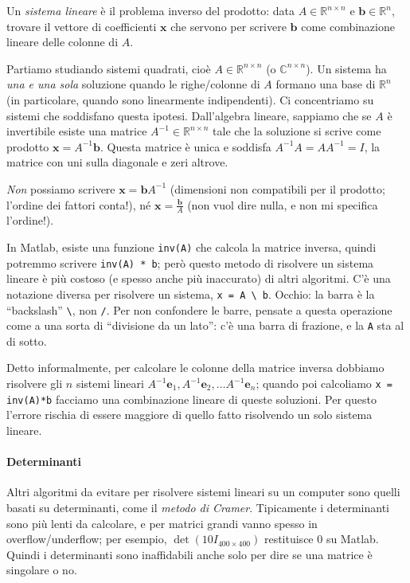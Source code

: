 \documentclass[a4paper]{report}
\theoremstyle{definiton}
\theoremstyle{remark}
\begin{document}

Un \emph{sistema lineare} è il problema inverso del prodotto: data $A\in\mathbb{R}^{n\times n}$ e $\mathbf{b} \in \mathbb{R}^n$, trovare il vettore di coefficienti $\mathbf{x}$ che servono per scrivere $\mathbf{b}$ come combinazione lineare delle colonne di $A$.

Partiamo studiando sistemi quadrati, cioè $A \in \mathbb{R}^{n\times n}$ (o $\mathbb{C}^{n\times n}$). Un sistema ha \emph{una e una sola} soluzione quando le righe/colonne di $A$ formano una base di $\mathbb{R}^n$ (in particolare, quando sono linearmente indipendenti). Ci concentriamo su sistemi che soddisfano questa ipotesi. Dall'algebra lineare, sappiamo che se $A$ è invertibile esiste una matrice $A^{-1}\in\mathbb{R}^{n\times n}$ tale che la soluzione si scrive come prodotto $\mathbf{x} = A^{-1}\mathbf{b}$. Questa matrice è unica e soddisfa $A^{-1}A=AA^{-1}= I$, la matrice con uni sulla diagonale e zeri altrove.

\emph{Non} possiamo scrivere $\mathbf{x} = \mathbf{b}A^{-1}$ (dimensioni non compatibili per il prodotto; l'ordine dei fattori conta!), né $\mathbf{x} = \frac{\mathbf{b}}{A}$ (non vuol dire nulla, e non mi specifica l'ordine!).

In Matlab, esiste una funzione \lstinline{inv(A)} che calcola la matrice inversa, quindi potremmo scrivere \lstinline{inv(A) * b}; però questo metodo di risolvere un sistema lineare è più costoso (e spesso anche più inaccurato) di altri algoritmi. C'è una notazione diversa per risolvere un sistema, \lstinline{x = A \ b}. Occhio: la barra è la ``backslash'' \lstinline!\!, non \lstinline{/}. Per non confondere le barre, pensate a questa operazione come a una sorta di ``divisione da un lato'': c'è una barra di frazione, e la \lstinline{A} sta al di sotto.

Detto informalmente, per calcolare le colonne della matrice inversa dobbiamo risolvere gli $n$ sistemi lineari $A^{-1}\mathbf{e}_1, A^{-1}\mathbf{e}_2,\dots A^{-1}\mathbf{e}_n$; quando poi calcoliamo \texttt{x = inv(A)*b} facciamo una combinazione lineare di queste soluzioni. Per questo l'errore rischia di essere maggiore di quello fatto risolvendo un solo sistema lineare.

\paragraph{Determinanti} Altri algoritmi da evitare per risolvere sistemi lineari su un computer sono quelli basati su determinanti, come il \emph{metodo di Cramer}. Tipicamente i determinanti sono più lenti da calcolare, e per matrici grandi vanno spesso in overflow/underflow; per esempio, $\det(10 I_{400\times 400})$ restituisce $0$ su Matlab. Quindi i determinanti sono inaffidabili anche solo per dire se una matrice è singolare o no. 
\end{document}
